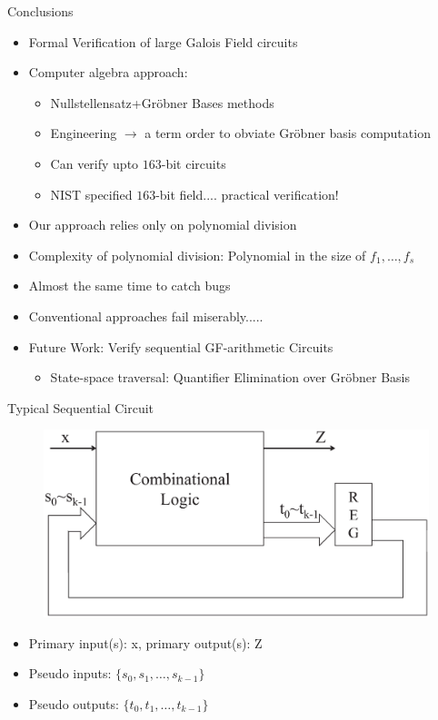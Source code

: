 \documentclass[xcolor=dvipsnames]{beamer}
\begin{document}
\begin{frame}{\large{Conclusions}}


\begin{itemize}
\item Formal Verification of large Galois Field circuits
\item Computer algebra approach:
\begin{itemize}
	\item  Nullstellensatz+Gr\"obner Bases methods
	\item Engineering $\rightarrow$ a term order to obviate
          Gr\"obner basis computation
	\item Can verify upto $163$-bit circuits
          \item NIST specified $163$-bit field.... practical verification!
\end{itemize}
\item Our approach relies only on polynomial division
\item Complexity of polynomial division: Polynomial in the size of
  $f_1, \dots, f_s$
\item Almost the same time to catch bugs
\item Conventional approaches fail miserably.....
\item Future Work: Verify sequential GF-arithmetic Circuits
\begin{itemize}
\item State-space traversal: Quantifier Elimination over Gr\"obner Basis
\end{itemize}
\end{itemize}

\end{frame}
\begin{frame}{\large{Typical Sequential Circuit}}
\begin{figure}[hbt]
\centerline{
\includegraphics[scale=0.25]{sequential_fig.eps}
}
\end{figure}

\begin{itemize}
\item Primary input(s): x, primary output(s): Z
\item Pseudo inputs: $\{s_0, s_1, \dots, s_{k-1}\}$
\item Pseudo outputs: $\{t_0, t_1, \dots, t_{k-1}\}$
\end{itemize}
\end{frame}
\end{document}
